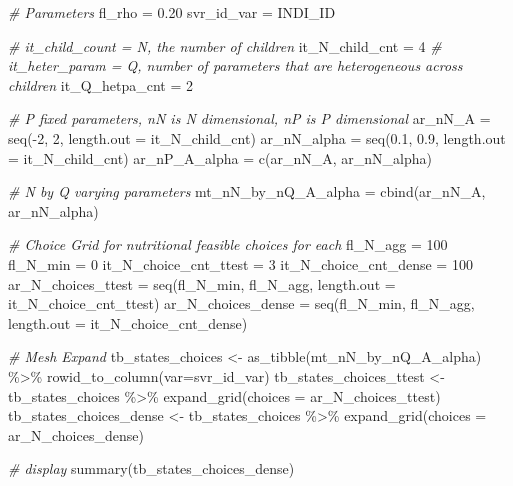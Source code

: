 \documentclass[
]{book}
\newenvironment{Shaded}{\begin{snugshade}}{\end{snugshade}}
\newcommand{\AttributeTok}[1]{\textcolor[rgb]{0.77,0.63,0.00}{#1}}
\newcommand{\CommentTok}[1]{\textcolor[rgb]{0.56,0.35,0.01}{\textit{#1}}}
\newcommand{\DecValTok}[1]{\textcolor[rgb]{0.00,0.00,0.81}{#1}}
\newcommand{\FloatTok}[1]{\textcolor[rgb]{0.00,0.00,0.81}{#1}}
\newcommand{\FunctionTok}[1]{\textcolor[rgb]{0.00,0.00,0.00}{#1}}
\newcommand{\NormalTok}[1]{#1}
\newcommand{\OtherTok}[1]{\textcolor[rgb]{0.56,0.35,0.01}{#1}}
\newcommand{\SpecialCharTok}[1]{\textcolor[rgb]{0.00,0.00,0.00}{#1}}
\newcommand{\StringTok}[1]{\textcolor[rgb]{0.31,0.60,0.02}{#1}}
\begin{document}
\begin{Shaded}
\begin{Highlighting}[]
\CommentTok{\# Parameters}
\NormalTok{fl\_rho }\OtherTok{=} \FloatTok{0.20}
\NormalTok{svr\_id\_var }\OtherTok{=} \StringTok{\textquotesingle{}INDI\_ID\textquotesingle{}}

\CommentTok{\# it\_child\_count = N, the number of children}
\NormalTok{it\_N\_child\_cnt }\OtherTok{=} \DecValTok{4}
\CommentTok{\# it\_heter\_param = Q, number of parameters that are heterogeneous across children}
\NormalTok{it\_Q\_hetpa\_cnt }\OtherTok{=} \DecValTok{2}

\CommentTok{\# P fixed parameters, nN is N dimensional, nP is P dimensional}
\NormalTok{ar\_nN\_A }\OtherTok{=} \FunctionTok{seq}\NormalTok{(}\SpecialCharTok{{-}}\DecValTok{2}\NormalTok{, }\DecValTok{2}\NormalTok{, }\AttributeTok{length.out =}\NormalTok{ it\_N\_child\_cnt)}
\NormalTok{ar\_nN\_alpha }\OtherTok{=} \FunctionTok{seq}\NormalTok{(}\FloatTok{0.1}\NormalTok{, }\FloatTok{0.9}\NormalTok{, }\AttributeTok{length.out =}\NormalTok{ it\_N\_child\_cnt)}
\NormalTok{ar\_nP\_A\_alpha }\OtherTok{=} \FunctionTok{c}\NormalTok{(ar\_nN\_A, ar\_nN\_alpha)}

\CommentTok{\# N by Q varying parameters}
\NormalTok{mt\_nN\_by\_nQ\_A\_alpha }\OtherTok{=} \FunctionTok{cbind}\NormalTok{(ar\_nN\_A, ar\_nN\_alpha)}

\CommentTok{\# Choice Grid for nutritional feasible choices for each}
\NormalTok{fl\_N\_agg }\OtherTok{=} \DecValTok{100}
\NormalTok{fl\_N\_min }\OtherTok{=} \DecValTok{0}
\NormalTok{it\_N\_choice\_cnt\_ttest }\OtherTok{=} \DecValTok{3}
\NormalTok{it\_N\_choice\_cnt\_dense }\OtherTok{=} \DecValTok{100}
\NormalTok{ar\_N\_choices\_ttest }\OtherTok{=} \FunctionTok{seq}\NormalTok{(fl\_N\_min, fl\_N\_agg, }\AttributeTok{length.out =}\NormalTok{ it\_N\_choice\_cnt\_ttest)}
\NormalTok{ar\_N\_choices\_dense }\OtherTok{=} \FunctionTok{seq}\NormalTok{(fl\_N\_min, fl\_N\_agg, }\AttributeTok{length.out =}\NormalTok{ it\_N\_choice\_cnt\_dense)}

\CommentTok{\# Mesh Expand}
\NormalTok{tb\_states\_choices }\OtherTok{\textless{}{-}} \FunctionTok{as\_tibble}\NormalTok{(mt\_nN\_by\_nQ\_A\_alpha) }\SpecialCharTok{\%\textgreater{}\%} \FunctionTok{rowid\_to\_column}\NormalTok{(}\AttributeTok{var=}\NormalTok{svr\_id\_var)}
\NormalTok{tb\_states\_choices\_ttest }\OtherTok{\textless{}{-}}\NormalTok{ tb\_states\_choices }\SpecialCharTok{\%\textgreater{}\%} \FunctionTok{expand\_grid}\NormalTok{(}\AttributeTok{choices =}\NormalTok{ ar\_N\_choices\_ttest)}
\NormalTok{tb\_states\_choices\_dense }\OtherTok{\textless{}{-}}\NormalTok{ tb\_states\_choices }\SpecialCharTok{\%\textgreater{}\%} \FunctionTok{expand\_grid}\NormalTok{(}\AttributeTok{choices =}\NormalTok{ ar\_N\_choices\_dense)}

\CommentTok{\# display}
\FunctionTok{summary}\NormalTok{(tb\_states\_choices\_dense)}
\end{Highlighting}
\end{Shaded}
\end{document}
